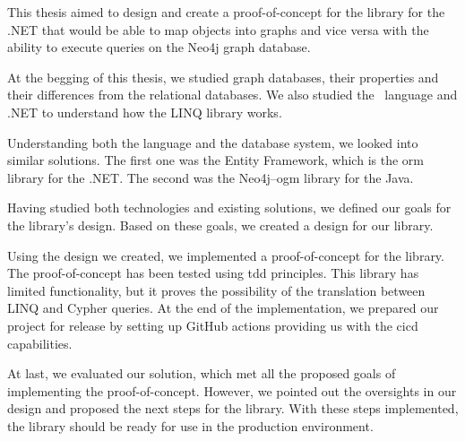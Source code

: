 \begin{conclusion}

    This thesis aimed to design and create a proof-of-concept for the library for the .NET that would be able to map objects into graphs and vice versa with the ability to execute queries on the Neo4j graph database.

    At the begging of this thesis, we studied graph databases, their properties and their differences from the relational databases.
    We also studied the \CS\ language and .NET to understand how the LINQ library works.

    Understanding both the language and the database system, we looked into similar solutions. The first one was the Entity Framework, which is the \acrshort{orm} library for the .NET.
    The second was the Neo4j--\acrshort{ogm} library for the Java.

    Having studied both technologies and existing solutions, we defined our goals for the library's design.
    Based on these goals, we created a design for our library.

    Using the design we created, we implemented a proof-of-concept for the library.
    The proof-of-concept has been tested using \acrshort{tdd} principles.
    This library has limited functionality, but it proves the possibility of the translation between LINQ and Cypher queries.
    At the end of the implementation, we prepared our project for release by setting up GitHub actions providing us with the \acrshort{cicd} capabilities.

    \pagebreak

    At last, we evaluated our solution, which met all the proposed goals of implementing the proof-of-concept.
    However, we pointed out the oversights in our design and proposed the next steps for the library.
    With these steps implemented, the library should be ready for use in the production environment.


\end{conclusion}